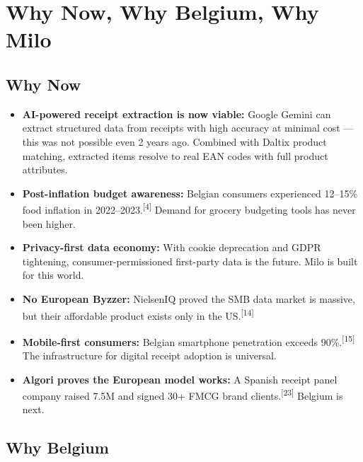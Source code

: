 \documentclass[11pt,a4paper]{article}
\begin{document}
\clearpage

\section{Why Now, Why Belgium, Why Milo}

\subsection{Why Now}

\begin{itemize}[leftmargin=1.5em, itemsep=4pt]
  \item \textbf{AI-powered receipt extraction is now viable:} Google Gemini can extract structured data from receipts with high accuracy at minimal cost --- this was not possible even 2 years ago. Combined with Daltix product matching, extracted items resolve to real EAN codes with full product attributes.
  \item \textbf{Post-inflation budget awareness:} Belgian consumers experienced 12--15\% food inflation in 2022--2023.\textsuperscript{[4]} Demand for grocery budgeting tools has never been higher.
  \item \textbf{Privacy-first data economy:} With cookie deprecation and GDPR tightening, consumer-permissioned first-party data is the future. Milo is built for this world.
  \item \textbf{No European Byzzer:} NielsenIQ proved the SMB data market is massive, but their affordable product exists only in the US.\textsuperscript{[14]}
  \item \textbf{Mobile-first consumers:} Belgian smartphone penetration exceeds 90\%.\textsuperscript{[15]} The infrastructure for digital receipt adoption is universal.
  \item \textbf{Algori proves the European model works:} A Spanish receipt panel company raised \texteuro{}7.5M and signed 30+ FMCG brand clients.\textsuperscript{[23]} Belgium is next.
\end{itemize}

\subsection{Why Belgium}
\end{document}
